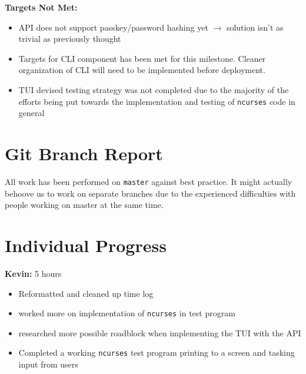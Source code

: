 \documentclass[11pt]{article}
\begin{document}
\textbf{Targets Not Met:}
\begin{itemize}
  \item API does not support passkey/password hashing yet $\rightarrow$ solution isn't as trivial as previously
    thought
  \item Targets for CLI component has been met for this milestone. Cleaner organization of CLI will need to be implemented 
    before deployment. 
  \item TUI devised testing strategy was not completed due to the majority of the efforts being put towards the
    implementation and testing of \texttt{ncurses} code in general 
\end{itemize}


\section{Git Branch Report}
All work has been performed on \texttt{master} against best practice. It might actually behoove us to
work on separate branches due to the experienced difficulties with people working on master at the same
time.


\section{Individual Progress}

\textbf{Kevin:} 5 hours
\begin{itemize}
  \item Reformatted and cleaned up time log
  \item worked more on implementation of \texttt{ncurses} in test program
  \item researched more possible roadblock when implementing the TUI with the API
  \item Completed a working \texttt{ncurses} test program printing to a screen and tasking input from users
\end{itemize}
\end{document}
